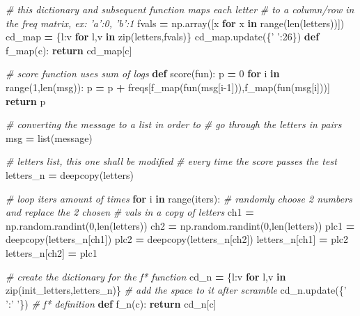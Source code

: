 \documentclass[]{article}
\newenvironment{Shaded}{\begin{snugshade}}{\end{snugshade}}
\newcommand{\BuiltInTok}[1]{#1}
\newcommand{\CommentTok}[1]{\textcolor[rgb]{0.56,0.35,0.01}{\textit{#1}}}
\newcommand{\ControlFlowTok}[1]{\textcolor[rgb]{0.13,0.29,0.53}{\textbf{#1}}}
\newcommand{\DecValTok}[1]{\textcolor[rgb]{0.00,0.00,0.81}{#1}}
\newcommand{\KeywordTok}[1]{\textcolor[rgb]{0.13,0.29,0.53}{\textbf{#1}}}
\newcommand{\NormalTok}[1]{#1}
\newcommand{\OperatorTok}[1]{\textcolor[rgb]{0.81,0.36,0.00}{\textbf{#1}}}
\newcommand{\StringTok}[1]{\textcolor[rgb]{0.31,0.60,0.02}{#1}}
\begin{document}
\begin{Shaded}
\begin{Highlighting}[]
    \CommentTok{# this dictionary and subsequent function maps each letter}
    \CommentTok{# to a column/row in the freq matrix, ex: 'a':0, 'b':1 }
\NormalTok{    fvals }\OperatorTok{=}\NormalTok{ np.array([x }\ControlFlowTok{for}\NormalTok{ x }\KeywordTok{in} \BuiltInTok{range}\NormalTok{(}\BuiltInTok{len}\NormalTok{(letters))])}
\NormalTok{    cd_map }\OperatorTok{=}\NormalTok{ \{l:v }\ControlFlowTok{for}\NormalTok{ l,v }\KeywordTok{in} \BuiltInTok{zip}\NormalTok{(letters,fvals)\}}
\NormalTok{    cd_map.update(\{}\StringTok{' '}\NormalTok{:}\DecValTok{26}\NormalTok{\})}
    \KeywordTok{def}\NormalTok{ f_map(c):}
        \ControlFlowTok{return}\NormalTok{ cd_map[c]}

    \CommentTok{# score function uses sum of logs}
    \KeywordTok{def}\NormalTok{ score(fun):}
\NormalTok{        p }\OperatorTok{=} \DecValTok{0}
        \ControlFlowTok{for}\NormalTok{ i }\KeywordTok{in} \BuiltInTok{range}\NormalTok{(}\DecValTok{1}\NormalTok{,}\BuiltInTok{len}\NormalTok{(msg)):}
\NormalTok{            p }\OperatorTok{=}\NormalTok{ p }\OperatorTok{+}\NormalTok{ freqs[f_map(fun(msg[i}\DecValTok{-1}\NormalTok{])),f_map(fun(msg[i]))]}
        \ControlFlowTok{return}\NormalTok{ p}
    
    \CommentTok{# converting the message to a list in order to}
    \CommentTok{# go through the letters in pairs}
\NormalTok{    msg }\OperatorTok{=} \BuiltInTok{list}\NormalTok{(message)}

    \CommentTok{# letters list, this one shall be modified}
    \CommentTok{# every time the score passes the test}
\NormalTok{    letters_n }\OperatorTok{=}\NormalTok{ deepcopy(letters)}

    \CommentTok{# loop iters amount of times}
    \ControlFlowTok{for}\NormalTok{ i }\KeywordTok{in} \BuiltInTok{range}\NormalTok{(iters):}
        \CommentTok{# randomly choose 2 numbers and replace the 2 chosen }
        \CommentTok{# vals in a copy of letters}
\NormalTok{        ch1 }\OperatorTok{=}\NormalTok{ np.random.randint(}\DecValTok{0}\NormalTok{,}\BuiltInTok{len}\NormalTok{(letters))}
\NormalTok{        ch2 }\OperatorTok{=}\NormalTok{ np.random.randint(}\DecValTok{0}\NormalTok{,}\BuiltInTok{len}\NormalTok{(letters))}
\NormalTok{        plc1 }\OperatorTok{=}\NormalTok{ deepcopy(letters_n[ch1])}
\NormalTok{        plc2 }\OperatorTok{=}\NormalTok{ deepcopy(letters_n[ch2])}
\NormalTok{        letters_n[ch1] }\OperatorTok{=}\NormalTok{ plc2}
\NormalTok{        letters_n[ch2] }\OperatorTok{=}\NormalTok{ plc1}

        \CommentTok{# create the dictionary for the f* function}
\NormalTok{        cd_n }\OperatorTok{=}\NormalTok{ \{l:v }\ControlFlowTok{for}\NormalTok{ l,v }\KeywordTok{in} \BuiltInTok{zip}\NormalTok{(init_letters,letters_n)\}}
        \CommentTok{# add the space to it after scramble}
\NormalTok{        cd_n.update(\{}\StringTok{' '}\NormalTok{:}\StringTok{' '}\NormalTok{\})}
        \CommentTok{# f* definition}
        \KeywordTok{def}\NormalTok{ f_n(c):}
            \ControlFlowTok{return}\NormalTok{ cd_n[c]}
    

\end{Highlighting}
\end{Shaded}
\end{document}
